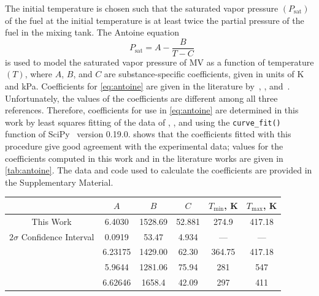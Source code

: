 \documentclass[letterpaper, review, sort&compress]{elsarticle}
\newcommand*{\logten}{\mathop{\log_{10}}}
\begin{document}
The initial temperature is chosen such that the saturated vapor pressure \((P_{\text{sat}})\) of the
fuel at the initial temperature is at least twice the partial pressure of the fuel in the mixing
tank. The Antoine equation
%
\begin{equation}\label{eq:antoine}
    \logten{P_{\text{sat}}} = A - \frac{B}{T - C}
\end{equation}
%
is used to model the saturated vapor pressure of MV as a function of temperature \((T)\), where
\(A\), \(B\), and \(C\) are substance-specific coefficients, given in units of \si{\kelvin} and
\si{\kPa}. Coefficients for \cref{eq:antoine} are given in the literature by~\citet{Ortega2003},
\citet{Camacho2007}, and~\citet{Stephenson1987}. Unfortunately, the values of the coefficients are
different among all three references. Therefore, coefficients for use in \cref{eq:antoine} are
determined in this work by least squares fitting of the data of \citet{Ortega2003},
\citet{vanGenderen2002}, and \citet{Verevkin2008} using the \verb|curve_fit()| function of
SciPy~\cite{Jones2001} version 0.19.0.  shows that the coefficients fitted
with this procedure give good agreement with the experimental data; values for the coefficients
computed in this work and in the literature works are given in \cref{tab:antoine}. The data and code
used to calculate the coefficients are provided in the Supplementary Material.

\begin{center}
    \captionsetup{type=table}
    \caption{Antoine Equation coefficients computed in this work and from the
    literature, in units of \si{\kelvin} and \si{\kPa}. The $2\sigma$ confidence interval is
    estimated by taking the square root of the diagonals of the covariance matrix returned from
    \texttt{curve\_fit()}}
    \label{tab:antoine}
    \begin{tabular}{cccccc}
        \toprule
        & $A$ & $B$ & $C$ & $T_{\text{min}}$, \si{\K} & $T_{\text{max}}$, \si{\K} \\
        \midrule
        This Work & 6.4030 & 1528.69 & 52.881 & 274.9 & 417.18 \\
        $2\sigma$ Confidence Interval & 0.0919 & 53.47 & 4.934 & --- & --- \\
        \citet{Ortega2003} & 6.23175 & 1429.00 & 62.30 & 364.75 & 417.18 \\
        \citet{Camacho2007} & 5.9644 & 1281.06 & 75.94 & 281 & 547 \\
        \citet{Stephenson1987} & 6.62646 & 1658.4 & 42.09 & 297 & 411 \\
        \bottomrule
    \end{tabular}
\end{center}
\end{document}
